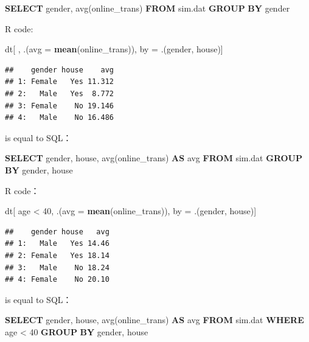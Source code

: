\documentclass[12pt,]{krantz}
\newenvironment{Shaded}{\begin{snugshade}}{\end{snugshade}}
\newcommand{\KeywordTok}[1]{\textcolor[rgb]{0.13,0.29,0.53}{\textbf{{#1}}}}
\newcommand{\DataTypeTok}[1]{\textcolor[rgb]{0.13,0.29,0.53}{{#1}}}
\newcommand{\DecValTok}[1]{\textcolor[rgb]{0.00,0.00,0.81}{{#1}}}
\newcommand{\StringTok}[1]{\textcolor[rgb]{0.31,0.60,0.02}{{#1}}}
\newcommand{\FunctionTok}[1]{\textcolor[rgb]{0.00,0.00,0.00}{{#1}}}
\newcommand{\NormalTok}[1]{{#1}}
\theoremstyle{definition}
\theoremstyle{definition}
\theoremstyle{remark}
\begin{document}
\begin{Shaded}
\begin{Highlighting}[]
\KeywordTok{SELECT}  \NormalTok{gender, }\FunctionTok{avg}\NormalTok{(online_trans) }\KeywordTok{FROM} \NormalTok{sim.dat }\KeywordTok{GROUP} \KeywordTok{BY} \NormalTok{gender}
\end{Highlighting}
\end{Shaded}

R code:

\begin{Shaded}
\begin{Highlighting}[]
\NormalTok{dt[ , .(}\DataTypeTok{avg =} \KeywordTok{mean}\NormalTok{(online_trans)), by =}\StringTok{ }\NormalTok{.(gender, house)]}
\end{Highlighting}
\end{Shaded}

\begin{verbatim}
##    gender house    avg
## 1: Female   Yes 11.312
## 2:   Male   Yes  8.772
## 3: Female    No 19.146
## 4:   Male    No 16.486
\end{verbatim}

is equal to SQL：

\begin{Shaded}
\begin{Highlighting}[]
\KeywordTok{SELECT} \NormalTok{gender, house, }\FunctionTok{avg}\NormalTok{(online_trans) }\KeywordTok{AS} \FunctionTok{avg} \KeywordTok{FROM} \NormalTok{sim.dat }\KeywordTok{GROUP} \KeywordTok{BY} \NormalTok{gender, house}
\end{Highlighting}
\end{Shaded}

R code：

\begin{Shaded}
\begin{Highlighting}[]
\NormalTok{dt[ age <}\StringTok{ }\DecValTok{40}\NormalTok{, .(}\DataTypeTok{avg =} \KeywordTok{mean}\NormalTok{(online_trans)), by =}\StringTok{ }\NormalTok{.(gender, house)]}
\end{Highlighting}
\end{Shaded}

\begin{verbatim}
##    gender house   avg
## 1:   Male   Yes 14.46
## 2: Female   Yes 18.14
## 3:   Male    No 18.24
## 4: Female    No 20.10
\end{verbatim}

is equal to SQL：

\begin{Shaded}
\begin{Highlighting}[]
\KeywordTok{SELECT} \NormalTok{gender, house, }\FunctionTok{avg}\NormalTok{(online_trans) }\KeywordTok{AS} \FunctionTok{avg} \KeywordTok{FROM} \NormalTok{sim.dat }\KeywordTok{WHERE} \NormalTok{age < }\DecValTok{40} \KeywordTok{GROUP} \KeywordTok{BY} \NormalTok{gender, house}
\end{Highlighting}
\end{Shaded}
\end{document}
